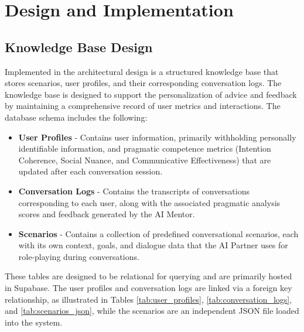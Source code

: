 
\chapter{Design and Implementation}\label{chap:chapter5}

\section{Knowledge Base Design}

Implemented in the architectural design is a structured knowledge base that stores scenarios, user profiles, and their corresponding conversation logs. The knowledge base is designed to support the personalization of advice and feedback by maintaining a comprehensive record of user metrics and interactions. The database schema includes the following:

\begin{itemize}
    \item \textbf{User Profiles} - Contains user information, primarily withholding personally identifiable information, and pragmatic competence metrics (Intention Coherence, Social Nuance, and Communicative Effectiveness) that are updated after each conversation session.
    \item \textbf{Conversation Logs} - Contains the transcripts of conversations corresponding to each user, along with the associated pragmatic analysis scores and feedback generated by the AI Mentor.
    \item \textbf{Scenarios} - Contains a collection of predefined conversational scenarios, each with its own context, goals, and dialogue data that the AI Partner uses for role-playing during conversations.
\end{itemize}

These tables are designed to be relational for querying and are primarily hosted in Supabase. The user profiles and conversation logs are linked via a foreign key relationship, as illustrated in Tables \ref{tab:user_profiles}, \ref{tab:conversation_logs}, and \ref{tab:scenarios_json}, while the scenarios are an independent JSON file loaded into the system.

